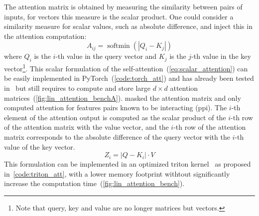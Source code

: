 \documentclass[../main.tex]{subfiles}
\begin{document}
		The attention matrix is obtained by measuring the similarity between pairs of inputs, for vectors this measure is the scalar product.
		One could consider a similarity measure for scalar values, such as absolute difference, and inject this in the attention computation:
		\begin{equation}
			A_{ij} = \operatorname{softmin}\left(\left|Q_{i} - K_{j} \right| \right) \label{eq:scalar_attention}
		\end{equation}
		where \(Q_{i}\) is the \(i\)-th value in the query vector and \(K_{j}\) is the \(j\)-th value in the key vector\footnote{Note that query, key and value are no longer matrices but vectors.}.
		This scalar formulation of the self-attention~(\cref{eq:scalar_attention}) can be easily implemented in PyTorch~(\cref{code:torch_att}) and has already been tested in~\cite{Lacan2023} but still requires to compute and store large \(d\times d\) attention matrices~(\cref{fig:lin_attention_benchA}).
		\citeauthor{Lacan2023} masked the attention matrix and only computed attention for features pairs known to be interacting (\gls{ppi})\cite{Lacan2023}.
		The \(i\)-th element of the attention output is computed as the scalar product of the \(i\)-th row of the attention matrix with the value vector, and the \(i\)-th row of the attention matrix corresponds to the absolute difference of the query vector with the \(i\)-th value of the key vector.
		\begin{equation}
			Z_{i} = \left| Q - K_{i} \right| \cdot V
		\end{equation}
		This formulation can be implemented in an optimized triton kernel~\cite{TritonLang} as proposed in~\cref{code:triton_att}, with a lower memory footprint withtout significantly increase the computation time~(\cref{fig:lin_attention_bench}).
\end{document}
